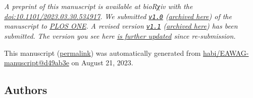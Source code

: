 \emph{A preprint of this manuscript is available at bioRχiv with the \href{https://doi.org/10.1101/2023.03.30.534917}{doi:10.1101/2023.03.30.534917}.}
\emph{We submitted \href{https://github.com/habi/EAWAG-manuscript/releases/tag/v1.0}{\texttt{v1.0}} (\href{https://habi.github.io/EAWAG-manuscript/v/e1e2ef76a476174a4115937d77457037ddec95df/}{archived here}) of the manuscript to \href{https://journals.plos.org/plosone/}{PLOS ONE}.}
\emph{A revised version \href{https://github.com/habi/EAWAG-manuscript/releases/tag/v1.1}{\texttt{v1.1}} (\href{https://habi.github.io/EAWAG-manuscript/v/c49d0b8ac8f078c226318972b06e8c4a39100bb2/}{archived here}) has been submitted.}
\emph{The version you see here \href{https://github.com/habi/EAWAG-manuscript/compare/df99415...d49ab3e8164a4169e27e9555874ff7f107c09650\#files_bucket}{is further updated} since re-submission.}

This manuscript
(\href{https://habi.github.io/EAWAG-manuscript/v/d49ab3e8164a4169e27e9555874ff7f107c09650/}{permalink})
was automatically generated
from \href{https://github.com/habi/EAWAG-manuscript/tree/d49ab3e8164a4169e27e9555874ff7f107c09650}{habi/EAWAG-manuscript@d49ab3e}
on August 21, 2023.

\hypertarget{authors}{%
\subsection{Authors}\label{authors}}

